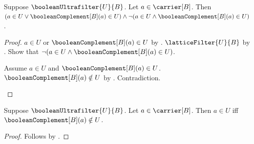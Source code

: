 \begin{theorem}\label{boolean_ultrafilter_exactly_one_element_or_complement}
    Suppose $\booleanUltrafilter{U}{B}$.
    Let $a\in\carrier[B]$.
    Then $(a\in U\lor\booleanComplement[B](a)\in U)\land
        \lnot(a\in U\land\booleanComplement[B](a)\in U)$.
\end{theorem}
\begin{proof}
    $a\in U$ or $\booleanComplement[B](a)\in U$ by
        .
    $\latticeFilter{U}{B}$ by
        .
    Show that
        $\lnot(a\in U\land\booleanComplement[B](a)\in U)$.
    \begin{subproof}
        Assume $a\in U$ and $\booleanComplement[B](a)\in U$.
        $\booleanComplement[B](a)\notin U$ by
            .
        Contradiction.
    \end{subproof}
\end{proof}

\begin{proposition}\label{boolean_ultrafilter_element_iff_complement_notin}
    Suppose $\booleanUltrafilter{U}{B}$.
    Let $a\in\carrier[B]$.
    Then $a\in U$ iff $\booleanComplement[B](a)\notin U$.
\end{proposition}
\begin{proof}
    Follows by
        .
\end{proof}

